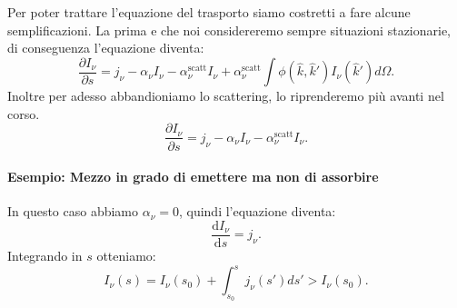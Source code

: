 Per poter trattare l'equazione del trasporto siamo costretti a fare alcune semplificazioni. La prima e che noi considereremo sempre situazioni stazionarie, di conseguenza l'equazione diventa:
\[
	\frac{\partial I_{\nu}}{\partial s} =
	j _{\nu} 
	- \alpha_{\nu}I_{\nu} 
	- \alpha_{\nu}^{\text{scatt}}I_{\nu} 
	+ \alpha_{\nu}^{\text{scatt}} \int\phi\left( \hat{k},\hat{k}' \right) I_{\nu}\left( \hat{k}' \right) d\Omega
.\] 
Inoltre per adesso abbandioniamo lo scattering, lo riprenderemo più avanti nel corso.
\[
	\frac{\partial I_{\nu}}{\partial s} =
	j _{\nu} 
	- \alpha_{\nu}I_{\nu} 
	- \alpha_{\nu}^{\text{scatt}}I_{\nu} 
.\] 
\paragraph{Esempio: Mezzo in grado di emettere ma non di assorbire}%
In questo caso abbiamo $\alpha_{\nu}=0$, quindi l'equazione diventa:
\[
	\frac{\mbox{d} I_{\nu}}{\mbox{d} s} = j _{\nu}
.\] 
Integrando in $s$ otteniamo:
\[
	I_{\nu}\left( s \right) = I_{\nu}\left( s_0 \right) + \int_{s_0}^{s} j _{\nu}\left( s' \right) ds' > I_{\nu} ( s_0) 
.\] 
